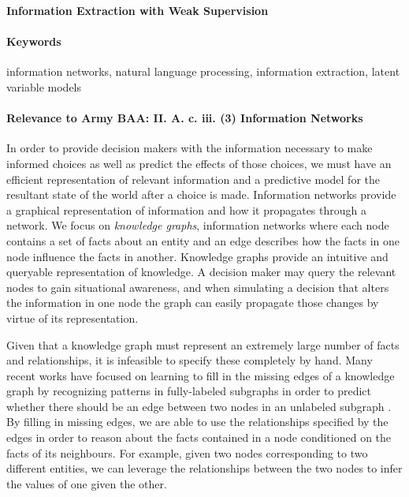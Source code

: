 \documentclass[12pt]{article}
\begin{document}

\begin{center}
\textbf{Information Extraction with Weak Supervision}
\end{center}

\paragraph{Keywords}
information networks, natural language processing, information extraction, latent variable models

\paragraph{Relevance to Army BAA: II. A. c. iii. (3) Information Networks}
In order to provide decision makers with the information
necessary to make informed choices as well as predict the effects of those choices,
we must have an efficient representation of relevant information and a predictive model
for the resultant state of the world after a choice is made.
Information networks provide a graphical representation of information and how it
propagates through a network.
We focus on \textit{knowledge graphs}, information networks where each node contains a set of facts
about an entity and an edge describes how the facts in one node influence the facts in another.
Knowledge graphs provide an intuitive and queryable representation of knowledge.
A decision maker may query the relevant nodes to gain situational awareness, and
when simulating a decision that alters the information in one node
the graph can easily propagate those changes by virtue of its representation.

Given that a knowledge graph must represent an extremely large number of facts and relationships,
it is infeasible to specify these completely by hand.
Many recent works have focused on learning to fill in the missing edges of a knowledge graph
by recognizing patterns in fully-labeled subgraphs in order to predict whether there should
be an edge between two nodes in an unlabeled subgraph \citep{chen2018diva}.
By filling in missing edges, we are able to use the relationships specified by the edges
in order to reason about the facts contained in a node conditioned on the facts of its
neighbours.
For example, given two nodes corresponding to two different entities,
we can leverage the relationships between the two nodes to infer the
values of one given the other.
\end{document}
